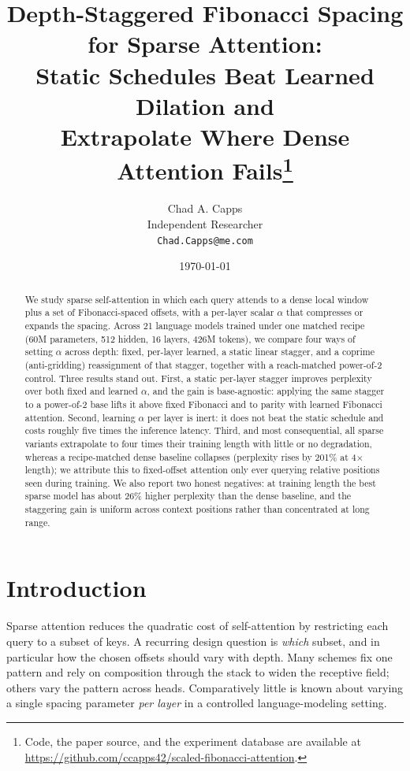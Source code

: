 \documentclass[11pt]{article}
\title{Depth-Staggered Fibonacci Spacing for Sparse Attention:\\
Static Schedules Beat Learned Dilation and\\
Extrapolate Where Dense Attention Fails\thanks{Code, the paper source, and the
experiment database are available at
\url{https://github.com/ccapps42/scaled-fibonacci-attention}.}}
\author{%
  Chad A. Capps\\
  Independent Researcher\\
  \texttt{Chad.Capps@me.com}
}
\date{\today}
\begin{document}
\maketitle

\begin{abstract}
We study sparse self-attention in which each query attends to a dense local
window plus a set of Fibonacci-spaced offsets, with a per-layer scalar $\alpha$
that compresses or expands the spacing. Across 21 language models trained under
one matched recipe (60M parameters, 512 hidden, 16 layers, 426M tokens), we
compare four ways of setting $\alpha$ across depth: fixed, per-layer learned,
a static linear stagger, and a coprime (anti-gridding) reassignment of that
stagger, together with a reach-matched power-of-2 control. Three results stand
out. First, a static per-layer stagger improves perplexity over both fixed and
learned $\alpha$, and the gain is base-agnostic: applying the same stagger to a
power-of-2 base lifts it above fixed Fibonacci and to parity with learned
Fibonacci attention. Second,
learning $\alpha$ per layer is inert: it does not beat the static schedule and
costs roughly five times the inference latency. Third, and most consequential,
all sparse variants extrapolate to four times their training length with little
or no degradation, whereas a recipe-matched dense baseline collapses
(perplexity rises by 201\% at 4$\times$ length); we attribute this to
fixed-offset attention only ever querying relative positions seen during
training. We also report two honest negatives: at training length the best sparse
model has about 26\% higher perplexity than the dense baseline, and the
staggering gain is uniform across context positions rather than concentrated at
long range.
\end{abstract}

\section{Introduction}

Sparse attention reduces the quadratic cost of self-attention by restricting
each query to a subset of keys. A recurring design question is \emph{which}
subset, and in particular how the chosen offsets should vary with depth. Many
schemes fix one pattern and rely on composition through the stack to widen the
receptive field; others vary the pattern across heads. Comparatively little is
known about varying a single spacing parameter \emph{per layer} in a controlled
language-modeling setting.
\end{document}
